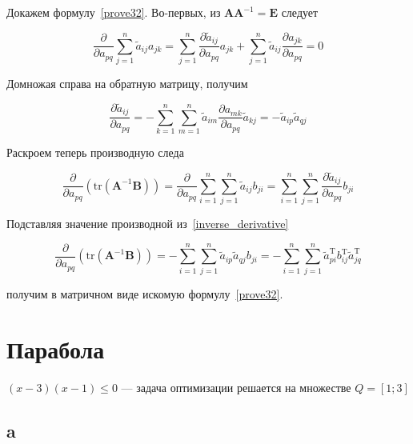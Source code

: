 	Докажем формулу~\eqref{prove32}. Во-первых, из $\mathbf{A}\mathbf{A}^{-1} = \mathbf{E}$ следует
	
	\begin{equation}
	\frac{\partial}{\partial a_{pq}} \sum\limits_{j=1}^{n} \tilde{a}_{ij} a_{jk} =  \sum\limits_{j=1}^{n} \frac{\partial \tilde{a}_{ij}}{\partial a_{pq}} a_{jk} + \sum\limits_{j=1}^{n} \tilde{a}_{ij}  \frac{\partial a_{jk}}{\partial a_{pq}} = 0
	\end{equation}
	
	Домножая справа на обратную матрицу, получим
	
	\begin{equation}
	\label{inverse_derivative}
	\frac{\partial \tilde{a}_{ij}}{\partial a_{pq}} = - \sum\limits_{k=1}^{n} \sum\limits_{m=1}^{n} \tilde{a}_{im}  \frac{\partial a_{mk}}{\partial a_{pq}} \tilde{a}_{kj}  = - \tilde{a}_{ip}  \tilde{a}_{qj} 
	\end{equation}
	
	Раскроем теперь производную следа
	
	\begin{equation}
	\frac{\partial}{\partial a_{pq}}(\text{tr}(\mathbf{A}^{-1}\mathbf{B})) = \frac{\partial}{\partial a_{pq}} \sum\limits_{i=1}^{n} \sum\limits_{j=1}^{n} \tilde{a}_{ij} b_{ji} = \sum\limits_{i=1}^{n} \sum\limits_{j=1}^{n} \frac{\partial \tilde{a}_{ij}}{\partial a_{pq}} b_{ji}
	\end{equation}
	
	Подставляя значение производной из~\eqref{inverse_derivative}
	
	\begin{equation}
	\frac{\partial}{\partial a_{pq}}(\text{tr}(\mathbf{A}^{-1}\mathbf{B})) = - \sum\limits_{i=1}^{n} \sum\limits_{j=1}^{n} \tilde{a}_{ip}  \tilde{a}_{qj}  b_{ji} =  - \sum\limits_{i=1}^{n} \sum\limits_{j=1}^{n} \tilde{a}_{pi}^\text{T} b_{ij}^\text{T}  \tilde{a}_{jq}^\text{T} 
	\end{equation}
	
	получим в матричном виде искомую формулу~\eqref{prove32}.
	\section{Парабола}
	$(x-3)(x-1) \leqslant 0$ --- задача оптимизации решается на множестве $Q = \left[ 1;3\right] $
	
	\subsection{a}
	
